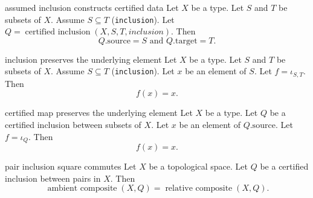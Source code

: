\begin{cleanresult}{assumed inclusion constructs certified data}
Let $X$ be a type.
Let $S$ and $T$ be subsets of $X$.
Assume $S\subseteq T$ (\texttt{inclusion}).
Let $Q = \operatorname{certified\ inclusion}(X, S, T, \mathit{inclusion})$.
Then \[Q.\mathrm{source}=S\text{ and }Q.\mathrm{target}=T.\]
\end{cleanresult}

\begin{cleanresult}{inclusion preserves the underlying element}
Let $X$ be a type.
Let $S$ and $T$ be subsets of $X$.
Assume $S\subseteq T$ (\texttt{inclusion}).
Let $x$ be an element of $S$.
Let $f = \iota_{S,T}$.
Then \[f(x)=x.\]
\par{}
\end{cleanresult}

\begin{cleanresult}{certified map preserves the underlying element}
Let $X$ be a type.
Let $Q$ be a certified inclusion between subsets of $X$.
Let $x$ be an element of $Q.\mathrm{source}$.
Let $f = \iota_{Q}$.
Then \[f(x)=x.\]
\par{}
\end{cleanresult}

\begin{cleanresult}{pair inclusion square commutes}
Let $X$ be a topological space.
Let $Q$ be a certified inclusion between pairs in $X$.
Then \[\operatorname{ambient\ composite}(X, Q)=\operatorname{relative\ composite}(X, Q).\]
\end{cleanresult}

